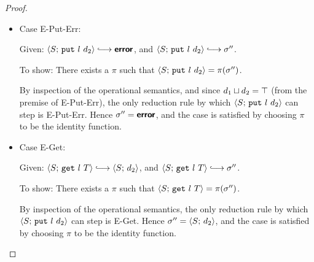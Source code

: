 \begin{proof}
\begin{itemize}
      \item Case {\sc E-Put-Err}:

      Given: $\config{S}{\putexp{l}{d_2}} \parstepsto \error$, and
      $\config{S}{\putexp{l}{d_2}} \parstepsto \conf''$.

      To show: There exists a $\pi$ such that
      $\langle S;\, \mbox{\texttt{put}}~l~d_2 \rangle = \pi(\sigma'')$.

      By inspection of the operational semantics, and since
      $d_1 \sqcup d_2 = \top$ (from the premise of {\sc
      E-Put-Err}), the only reduction rule by which
      $\langle S;\, \mbox{\texttt{put}}~l~d_2 \rangle$ can step is {\sc E-Put-Err}.
      Hence $\sigma'' = \textbf{\textsf{error}}$, and the case is satisfied by choosing
      $\pi$ to be the identity function.

      \item Case {\sc E-Get}:

      Given: $\config{S}{\getexp{l}{T}} \parstepsto \config{S}{d_2}$,
      and $\config{S}{\getexp{l}{T}} \parstepsto \conf''$.

      To show: There exists a $\pi$ such that
      $\langle S;\, \mbox{\texttt{get}}~l~T \rangle = \pi(\sigma'')$.

      By inspection of the operational semantics, the only reduction
      rule by which $\langle S;\, \mbox{\texttt{put}}~l~d_2 \rangle$ can step is {\sc
      E-Get}.  Hence $\sigma'' = \langle S;\, d_2 \rangle$, and the case is
      satisfied by choosing $\pi$ to be the identity
      function.

  \end{itemize}
\end{proof}

